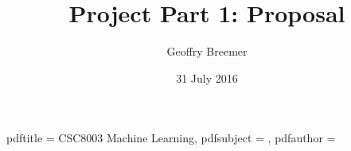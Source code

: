 \newcommand{\usqcoursecode}{CSC8003}
\newcommand{\usqcoursedescription}{Machine Learning}
\title{Project Part 1: Proposal}
\newcommand{\usqsubtitle}{}
\author{Geoffry Breemer}
\newcommand{\usqstudentnumber}{0061082147}
\newcommand{\usqstudentemail}{u1082147@umail.usq.edu.au}
\newcommand{\usqacademicyear}{2016}
\newcommand{\usqacademicsemester}{2}
\date{31 July 2016}
\newcommand{\usqpreparedfor}{Mr Tianning Li}
\newcommand{\usqpreparedforposition}{Assistant examiner}
\newcommand{\usqpreparedfororganisation}{School of Agricultural, Computational and Environmental Sciences}
\makeatletter
\hypersetup
{
  pdftitle   =  \usqcoursecode{} \usqcoursedescription,
  pdfsubject = \@title,
  pdfauthor  = \@author
}
\makeatother